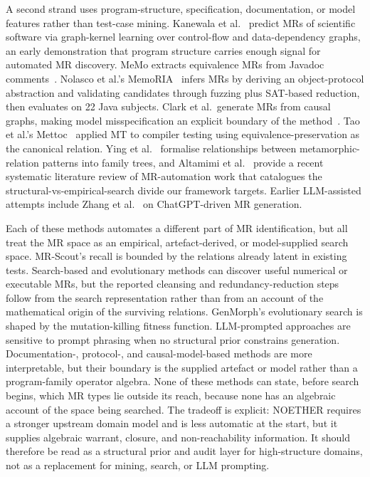 \documentclass[acmsmall,screen,anonymous,review]{acmart}
\begin{document}
A second strand uses program-structure, specification, documentation, or model features rather than test-case mining. Kanewala et al.~\cite{Kanewala2016GraphKernel} predict MRs of scientific software via graph-kernel learning over control-flow and data-dependency graphs, an early demonstration that program structure carries enough signal for automated MR discovery. MeMo extracts equivalence MRs from Javadoc comments~\cite{Blasi2021MeMo}. Nolasco et al.'s MemoRIA~\cite{Nolasco2024MemoRIA} infers MRs by deriving an object-protocol abstraction and validating candidates through fuzzing plus SAT-based reduction, then evaluates on 22 Java subjects. Clark et al.\ generate MRs from causal graphs, making model misspecification an explicit boundary of the method~\cite{Clark2023CausalMT}. Tao et al.'s Mettoc~\cite{Tao2010Mettoc} applied MT to compiler testing using equivalence-preservation as the canonical relation. Ying et al.~\cite{Ying2025MRPatterns} formalise relationships between metamorphic-relation patterns into family trees, and Altamimi et al.~\cite{Altamimi2022MRSLR} provide a recent systematic literature review of MR-automation work that catalogues the structural-vs-empirical-search divide our framework targets. Earlier LLM-assisted attempts include Zhang et al.~\cite{ZhangChatGPTMR2023} on ChatGPT-driven MR generation.

Each of these methods automates a different part of MR identification, but all treat the MR space as an empirical, artefact-derived, or model-supplied search space. MR-Scout's recall is bounded by the relations already latent in existing tests. Search-based and evolutionary methods can discover useful numerical or executable MRs, but the reported cleansing and redundancy-reduction steps follow from the search representation rather than from an account of the mathematical origin of the surviving relations. GenMorph's evolutionary search is shaped by the mutation-killing fitness function. LLM-prompted approaches are sensitive to prompt phrasing when no structural prior constrains generation. Documentation-, protocol-, and causal-model-based methods are more interpretable, but their boundary is the supplied artefact or model rather than a program-family operator algebra. None of these methods can state, before search begins, which MR types lie outside its reach, because none has an algebraic account of the space being searched. The tradeoff is explicit: NOETHER requires a stronger upstream domain model and is less automatic at the start, but it supplies algebraic warrant, closure, and non-reachability information. It should therefore be read as a structural prior and audit layer for high-structure domains, not as a replacement for mining, search, or LLM prompting.
\end{document}
